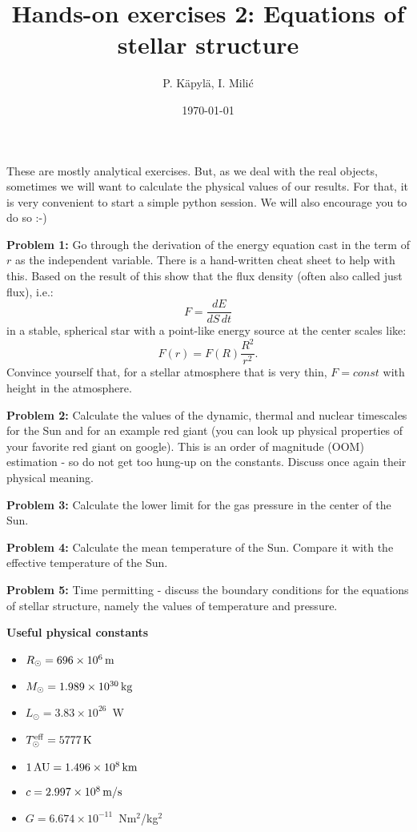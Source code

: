 \documentclass[12pt]{article}
\title{Hands-on exercises 2: Equations of stellar structure}
\author{P. K\"{a}pyl\"{a}, I. Mili\'{c}}
\date{\today}
\begin{document}
\maketitle


These are mostly analytical exercises. But, as we deal with the real objects, sometimes we will want to calculate the physical values of our results. For that, it is very convenient to start a simple python session. We will also encourage you to do so :-) 

{\bf Problem 1:} Go through the derivation of the energy equation cast in the term of $r$ as the independent variable. There is a hand-written cheat sheet to help with this. Based on the result of this show that the flux density (often also called just flux), i.e.:
\begin{equation}
F = \frac{dE}{dS\,dt}
\end{equation}
in a stable, spherical star with a point-like energy source at the center scales like: 
\begin{equation}
F(r) = F(R) \frac{R^2}{r^2}.
\end{equation}
Convince yourself that, for a stellar atmosphere that is very thin, $F=const$ with height in the atmosphere. 

{\bf Problem 2:} Calculate the values of the dynamic, thermal and nuclear timescales for the Sun and for an example red giant (you can look up physical properties of your favorite red giant on google). This is an order of magnitude (OOM) estimation - so do not get too hung-up on the constants. Discuss once again their physical meaning. 

{\bf Problem 3:} Calculate the lower limit for the gas pressure in the center of the Sun. 

{\bf Problem 4:} Calculate the mean temperature of the Sun. Compare it with the effective temperature of the Sun. 

{\bf Problem 5:} Time permitting - discuss the boundary conditions for the equations of stellar structure, namely the values of temperature and pressure. 

{\bf Useful physical constants}
\begin{itemize}
  \item $R_{\odot} = 696 \times 10^6\,{\rm m}$
  \item $M_{\odot} = 1.989 \times 10^{30}\,{\rm kg}$
  \item $L_{\odot} = 3.83 \times 10^{26}$~W
  \item $T^{\rm eff}_{\odot} = 5777\,{\rm K}$
  \item $1\,{\rm AU} = 1.496 \times 10^8\,{\rm km}$
  \item $c = 2.997 \times 10^8\,{\rm m/s}$
  \item $G = 6.674 \times 10^{-11}$~Nm$^2$/kg$^2$
\end{itemize}
\end{document}
